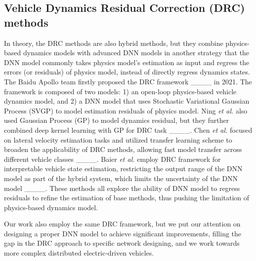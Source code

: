 \subsection{Vehicle Dynamics Residual Correction (DRC) methods}

In theory, the DRC methods are also hybrid methods, but they combine physics-based dynamics models with advanced DNN models in another strategy that the DNN model commonly takes physics model's estimation as input and regress the errors (or residuals) of physics model, instead of directly regress dynamics states.
The Baidu Apollo team firstly proposed the DRC framework ____ in 2021. The framework is composed of two models: 1) an open-loop physics-based vehicle dynamics model, and 2) a DNN model that uses Stochastic Variational Gaussian Process (SVGP) to model estimation residuals of physics model.
Ning \textit{et al.} also used Gaussian Process (GP) to model dynamics residual, but they further combined deep kernel learning with GP for DRC task ____.
Chen \textit{et al.} focused on lateral velocity estimation tasks and utilized transfer learning scheme to broaden the applicability of DRC methods, allowing fast model transfer across different vehicle classes ____. 
Baier \textit{et al.} employ DRC framework for interpretable vehicle state estimation, restricting the output range of the DNN model as part of the hybrid system, which limits the uncertainty of the DNN model ____.
These methods all explore the ability of DNN model to regress residuals to refine the estimation of base methods, thus pushing the limitation of physics-based dynamics model.
 
Our work also employ the same DRC framework, but we put our attention on designing a proper DNN model to achieve significant improvements, filling the gap in the DRC approach to specific network designing, and we work towards more complex distributed electric-driven vehicles.